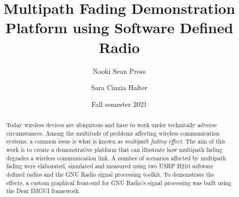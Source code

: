 \documentclass[
	overfullrule,
	paper = a4, twoside, openright, BCOR = 5mm,
	headinclude, footexclude,
	fontsize = 11pt,
	cleardoublepage = empty,
	titlepage, abstract = on,
	automark,
	numbers = noenddot
]{scrreprt}
\title{Multipath Fading Demonstration Platform using Software Defined Radio}
\author{Naoki Sean Pross \and Sara Cinzia Halter}
\date{Fall semester 2021}
\begin{document}
	\hypersetup{pageanchor = false}

	\maketitle

	\begin{abstract}
		Today wireless devices are ubiquitous and have to work under technically adverse circumstances. Among the multitude of problems affecting wireless communication systems, a common issue is what is known as \emph{multipath fading effect}. The aim of this work is to create a demonstrative platform that can illustrate how multipath fading degrades a wireless communication link. A number of scenarios affected by multipath fading were elaborated, simulated and measured using two USRP B210 software defined radios and the GNU Radio signal processing toolkit. To demonstrate the effects, a custom graphical front-end for GNU Radio's signal processing was built using the Dear IMGUI framework.
	\end{abstract}

	\cleardoublepage
	\setcounter{page}{1}

	\tableofcontents
	\cleardoublepage

\end{document}
